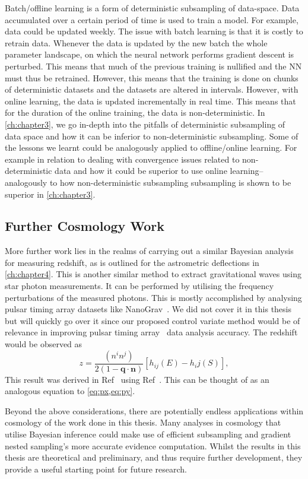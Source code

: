 Batch/offline learning is a form of deterministic subsampling of data-space. Data accumulated over a certain period of time is used to train a model. For example, data could be updated weekly. The issue with batch learning is that it is costly to retrain data. Whenever the data is updated by the new batch the whole parameter landscape, on which the neural network performs gradient descent is perturbed. This means that much of the previous training is nullified and the NN must thus be retrained. However, this means that the training is done on chunks of deterministic datasets and the datasets are altered in intervals. However, with online learning, the data is updated incrementally in real time. This means that for the duration of the online training, the data is non-deterministic. In \cref{ch:chapter3}, we go in-depth into the pitfalls of deterministic subsampling of data space and how it can be inferior to non-deterministic subsampling. Some of the lessons we learnt could be analogously applied to offline/online learning. For example in relation to dealing with convergence issues related to non-deterministic data and how it could be superior to use online learning--analogously to how non-deterministic subsampling subsampling is shown to be superior in \cref{ch:chapter3}.


\subsection{Further Cosmology Work}
More further work lies in the realms of carrying out a similar Bayesian analysis for measuring redshift, as is outlined for the astrometric deflections in \cref{ch:chapter4}. This is another similar method to extract gravitational waves using star photon measurements. It can be performed by utilising the frequency perturbations of the measured photons. This is mostly accomplished by analysing pulsar timing array datasets like NanoGrav~\cite{McLaughlin_2013}. We did not cover it in this thesis but will quickly go over it since our proposed control variate method would be of relevance in improving pulsar timing array~\cite{ 1975GReGr...6..439E} data analysis accuracy. The redshift would be observed as~\cite{Mihaylov_2020}
%
\begin{equation}
z=\frac{(n^{i} n^{j})}{2(1-\textbf{q} \cdot \textbf{n})}[h_{ij}(E)-h_ij(S)],
\end{equation}
%
This result was derived in Ref~\cite{Mihaylov_2020} using Ref~\cite{KAUFMANN1970}. This can be thought of as an analogous equation to \cref{eq:px,eq:py}. 

Beyond the above considerations, there are potentially endless applications within cosmology of the work done in this thesis. Many analyses in cosmology that utilise Bayesian inference could make use of efficient subsampling and gradient nested sampling's more accurate evidence computation. Whilst the results in this thesis are theoretical and preliminary, and thus require further development, they provide a useful starting point for future research.
